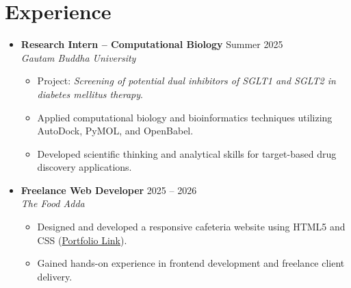 \documentclass[13pt,a4paper]{article}
\newcommand{\resumeItem}[1]{\item\small{#1}}
\newcommand{\resumeSubheading}[4]{
  \vspace{4pt}\item
    \textbf{#1} \hfill #2 \\
    \textit{#3} \hfill \textit{#4} \vspace{-4pt}
}
\begin{document}
\section{Experience}
\begin{itemize}[leftmargin=0.15in, label={}]
    \resumeSubheading
        {Research Intern -- Computational Biology}{Summer 2025}
        {Gautam Buddha University}{}
        \begin{itemize}
            \resumeItem{Project: \textit{Screening of potential dual inhibitors of SGLT1 and SGLT2 in diabetes mellitus therapy}.}
            \resumeItem{Applied computational biology and bioinformatics techniques utilizing AutoDock, PyMOL, and OpenBabel.}
            \resumeItem{Developed scientific thinking and analytical skills for target-based drug discovery applications.}
        \end{itemize}
    \resumeSubheading
        {Freelance Web Developer}{2025 -- 2026}
        {The Food Adda}{}
        \begin{itemize}
            \resumeItem{Designed and developed a responsive cafeteria website using HTML5 and CSS (\href{https://aman0001yadavdu-bit.github.io/The-Food-Adda-Website/}{Portfolio Link}).}
            \resumeItem{Gained hands-on experience in frontend development and freelance client delivery.}
        \end{itemize}
\end{itemize}

\end{document}
